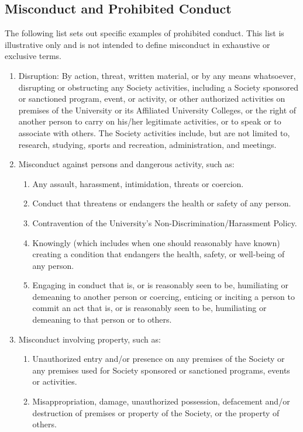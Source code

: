 \subsection{Misconduct and Prohibited Conduct}
The following list sets out specific examples of prohibited conduct. This list is illustrative only and is not intended to define misconduct in exhaustive or exclusive terms.
\begin{enumerate} [align=left]
\item Disruption: By action, threat, written material, or by any means whatsoever, disrupting or obstructing any Society activities, including a Society sponsored or sanctioned program, event, or activity, or other authorized activities on premises of the University or its Affiliated University Colleges, or the right of another person to carry on his/her legitimate activities, or to speak or to associate with others. The Society activities include, but are not limited to, research, studying, sports and recreation, administration, and meetings.
\item Misconduct against persons and dangerous activity, such as:
\begin{enumerate} [label*=\arabic*., align=left]
\item Any assault, harassment, intimidation, threats or coercion.
\item Conduct that threatens or endangers the health or safety of any person.
\item Contravention of the University's Non-Discrimination/Harassment Policy. 
\item Knowingly (which includes when one should reasonably have known) creating a condition that endangers the health, safety, or well-being of any person.
\item Engaging in conduct that is, or is reasonably seen to be, humiliating or demeaning to another person or coercing, enticing or inciting a person to commit an act that is, or is reasonably seen to be, humiliating or demeaning to that person or to others.
\end{enumerate}
\item Misconduct involving property, such as:
\begin{enumerate} [label*=\arabic*., align=left]
\item Unauthorized entry and/or presence on any premises of the Society or any premises used for Society sponsored or sanctioned programs, events or activities.
\item Misappropriation, damage, unauthorized possession, defacement and/or destruction of premises or property of the Society, or the property of others.

\end{enumerate}
\end{enumerate}
